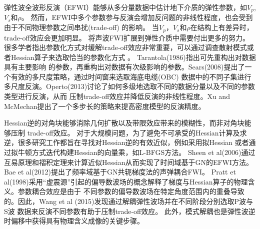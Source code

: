 弹性波全波形反演（EFWI）能够从多分量数据中估计地下介质的弹性参数，如$V_p$, $V_s$和$\rho$。
然而，EFWI中多个参数参与反演会增加反问题的非线性程度，也会受到由于不同物理参数之间串扰(trade-off)
的影响\cite{forgues.lambare:1997}。
当$V_p$，$V_s$和$\rho$在结构上有差异时，trade-off效应会更加明显。
将声波FWI扩展到弹性介质中需要付出更多的努力。
很多学者指出参数化方式对缓解trade-off效应非常重要，可以通过调查散射模式或者Hessian算子来选取恰当的参数化方式
\cite[]{wu.aki:1985,tarantola:1986,plessix.cao:2011,gholami2013}。
Tarantola(1986)\cite{tarantola:1986}指出可先重构出对数据具有主要影响
的参数，再重构出对数据有次级影响的参数。Sears(2008)\cite{sears2008}提出了一个有效的多尺度策略，通过时间窗来选取海底电缆(OBC)
数据中的不同子集进行多尺度反演。Operto(2013)\cite{operto2013guided}讨论了如何多级地选取不同的数据分量以及不同的参数类型进行反演，从而
压制trade-off效应并降低反演的非线性程度。Xu and McMechan\cite{xu.mcmechan:2014}提出了一个多步长的策略来提高密度模型的反演精度。

Hessian逆的对角块能够消除几何扩散以及带限效应带来的模糊性，而非对角块能够压制
trade-off效应\cite[]{pratt1998gauss,fichtner2011hessian,operto2013guided,innanen2014seismic,pan2015estimation}。
对于大规模问题，为了避免不可承受的Hessian计算及求逆，很多研究工作都旨在寻找对Hessian逆的有效近似，例如采用拟Hessian\cite[]{shin2001improved,choi.shin:2008}
或者通过拟牛顿方式迭代构建Hessian的向量乘，如L-BFGS方法\cite[]{nocedal2006numerical,brossier2009}。
Sheen et al(2006)\cite{sheen:2006}通过互易原理和褶积定理来计算近似Hessian从而实现了时间域基于GN的EFWI方法。
Bae et al(2012)\cite{bae:2012}提出了频率域基于GN共轭梯度法的声弹耦合FWI。
Pratt et al(1998)\cite{pratt1998gauss}采用“虚震源”引起的偏导数波场的概念解释了梯度与Hessian算子的物理含义。参数耦合效应是由于
不同参数的偏导数波场在特定角度范围内的重叠导致的。因此，Wang et al (2015)\cite{wang:2015}发现通过解耦弹性波场并在不同阶段分别选取P波与S波
数据来反演不同参数有助于压制trade-off效应。%
此外，模式解耦也是弹性波逆时偏移中获得具有物理含义成像的关键步骤\cite{yan:2008,wang2016scalar}。

